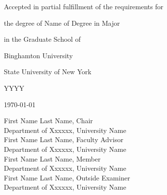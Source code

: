 \mbox{}
\vfill
\centerline{Accepted in partial fulfillment of the requirements for}
\centerline{the degree of {Name of Degree} in {Major}}
\centerline{in the Graduate School of}
\centerline{Binghamton University}
\centerline{State University of New York}
\centerline{YYYY}
\vspace*{\baselineskip}

\centerline{\today}
\vspace*{\baselineskip}

\begin{center}
    First Name Last Name, Chair\\
    Department of Xxxxxx, University Name\\
\vspace*{\baselineskip}
    First Name Last Name, Faculty Advisor\\
    Department of Xxxxxx, University Name\\
\vspace*{\baselineskip}
    First Name Last Name, Member\\
    Department of Xxxxxx, University Name\\
\vspace*{\baselineskip}
    First Name Last Name, Outside Examiner\\
    Department of Xxxxxx, University Name\\
\end{center}
\vspace*{1.0in}
